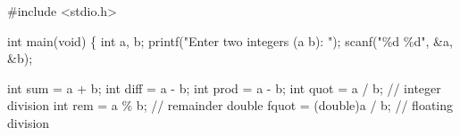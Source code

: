 \documentclass[
  letterpaper,
  DIV=11,
  numbers=noendperiod]{scrreprt}
\newenvironment{Shaded}{\begin{snugshade}}{\end{snugshade}}
\newcommand{\CommentTok}[1]{\textcolor[rgb]{0.37,0.37,0.37}{#1}}
\newcommand{\DataTypeTok}[1]{\textcolor[rgb]{0.68,0.00,0.00}{#1}}
\newcommand{\ImportTok}[1]{\textcolor[rgb]{0.00,0.46,0.62}{#1}}
\newcommand{\NormalTok}[1]{\textcolor[rgb]{0.00,0.23,0.31}{#1}}
\newcommand{\OperatorTok}[1]{\textcolor[rgb]{0.37,0.37,0.37}{#1}}
\newcommand{\PreprocessorTok}[1]{\textcolor[rgb]{0.68,0.00,0.00}{#1}}
\newcommand{\SpecialCharTok}[1]{\textcolor[rgb]{0.37,0.37,0.37}{#1}}
\newcommand{\StringTok}[1]{\textcolor[rgb]{0.13,0.47,0.30}{#1}}
\begin{document}
\begin{Shaded}
\begin{Highlighting}[]
\PreprocessorTok{\#include }\ImportTok{\textless{}stdio.h\textgreater{}}

\DataTypeTok{int}\NormalTok{ main}\OperatorTok{(}\DataTypeTok{void}\OperatorTok{)} \OperatorTok{\{}
    \DataTypeTok{int}\NormalTok{ a}\OperatorTok{,}\NormalTok{ b}\OperatorTok{;}
\NormalTok{    printf}\OperatorTok{(}\StringTok{"Enter two integers (a b): "}\OperatorTok{);}
\NormalTok{    scanf}\OperatorTok{(}\StringTok{"}\SpecialCharTok{\%d}\StringTok{ }\SpecialCharTok{\%d}\StringTok{"}\OperatorTok{,} \OperatorTok{\&}\NormalTok{a}\OperatorTok{,} \OperatorTok{\&}\NormalTok{b}\OperatorTok{);}

    \DataTypeTok{int}\NormalTok{ sum  }\OperatorTok{=}\NormalTok{ a }\OperatorTok{+}\NormalTok{ b}\OperatorTok{;}
    \DataTypeTok{int}\NormalTok{ diff }\OperatorTok{=}\NormalTok{ a }\OperatorTok{{-}}\NormalTok{ b}\OperatorTok{;}
    \DataTypeTok{int}\NormalTok{ prod }\OperatorTok{=}\NormalTok{ a }\OperatorTok{{-}}\NormalTok{ b}\OperatorTok{;}
    \DataTypeTok{int}\NormalTok{ quot }\OperatorTok{=}\NormalTok{ a }\OperatorTok{/}\NormalTok{ b}\OperatorTok{;}      \CommentTok{// integer division}
    \DataTypeTok{int}\NormalTok{ rem  }\OperatorTok{=}\NormalTok{ a }\OperatorTok{\%}\NormalTok{ b}\OperatorTok{;}      \CommentTok{// remainder}
    \DataTypeTok{double}\NormalTok{ fquot }\OperatorTok{=} \OperatorTok{(}\DataTypeTok{double}\OperatorTok{)}\NormalTok{a }\OperatorTok{/}\NormalTok{ b}\OperatorTok{;} \CommentTok{// floating division}


\end{Highlighting}
\end{Shaded}
\end{document}
